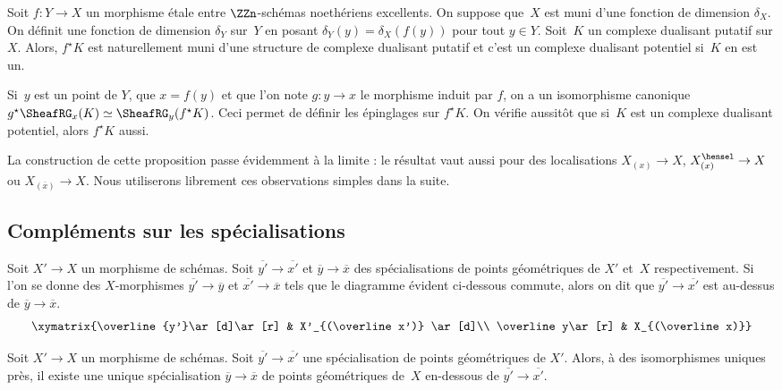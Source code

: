 \documentclass[10pt]{../fichiers-configuration-latex/smfart}
\begin{document}
\begin{proposition2}\label{17-proposition-stabilite-cdp-morphisme-etale}
Soit $f\colon Y\to X$ un morphisme étale entre $\ZZn$-schémas noethériens
excellents. On suppose que $X$ est muni d'une fonction de dimension
$\delta_X$. On définit une fonction de dimension $\delta_Y$ sur $Y$ en
posant $\delta_Y(y)=\delta_X(f(y))$ pour tout $y\in Y$. Soit $K$ un
complexe dualisant putatif sur $X$. Alors, $f^\star K$ est naturellement
muni d'une structure de complexe dualisant putatif et c'est un complexe
dualisant potentiel si $K$ en est un.
\end{proposition2}

Si $y$ est un point de $Y$, que $x=f(y)$ et que l'on note $g\colon y\to x$
le morphisme induit par $f$, on a un isomorphisme canonique $g^\star
\SheafRG_x(K)\simeq \SheafRG_y(f^\star K)$. Ceci permet de
définir les épinglages sur $f^\star K$. On vérifie aussitôt que si $K$ est
un complexe dualisant potentiel, alors $f^\star K$ aussi.

\bigskip

La construction de cette proposition passe évidemment à la limite : le
résultat vaut aussi pour des localisations $X_{(x)}\to X$,
$X_{(x)}^\hensel\to X$ ou $X_{(\overline x)}\to X$. Nous utiliserons
librement ces observations simples dans la suite.

\subsection{Compléments sur les spécialisations}%

\begin{definition2}\label{17-definition-specialisation-au-dessus-d-une-autre}
Soit $X'\to X$ un morphisme de schémas. Soit $\overline{y'}\to \overline{x'}$
et $\overline y\to \overline x$ des spécialisations de points géométriques 
de $X'$ et $X$ respectivement. Si l'on se donne des $X$-morphismes 
$\overline {y'}\to\overline y$ et $\overline{x'}\to \overline x$ tels que
le diagramme évident ci-dessous commute, alors on dit que 
$\overline{y'}\to\overline{x'}$
est au-dessus de $\overline y\to\overline x$.
\[\xymatrix{\overline {y'}\ar[d]\ar[r] & X'_{(\overline x')} \ar[d]\\
\overline y\ar[r] & X_{(\overline x)}}
\]
\end{definition2}


\begin{proposition2}\label{17-proposition-specialisation-going-down}
Soit $X'\to X$ un morphisme de schémas. Soit
$\overline {y'}\to\overline {x'}$ une
spécialisation de points géométriques de $X'$. Alors, à des isomorphismes
uniques près, il existe une unique spécialisation $\overline y\to\overline
x$ de points géométriques de $X$ en-dessous de $\overline {y'}\to\overline
{x'}$.
\end{proposition2}
\end{document}
